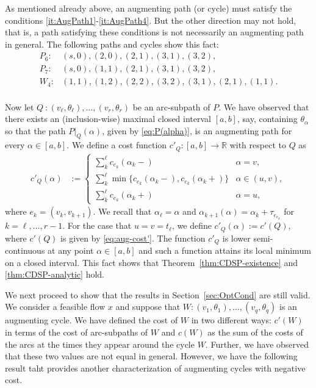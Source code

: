 \documentclass{svjour3}                     \smartqed
\newcommand{\rr}{\ensuremath{\mathbb{R}}}
\begin{document}
\begin{example}
As mentioned already above, an augmenting path (or cycle) must satisfy the conditions \eqref{it:AugPath1}-\eqref{it:AugPath4}. But the other direction may not hold, that is,
a path satisfying these conditions is not necessarily an augmenting path in general. The following paths and cycles show this fact:
\begin{align*}
P_6:&(s,0),(2,0),(2,1),(3,1),(3,2),\\
P_7:&(s,0),(1,1),(2,1),(3,1),(3,2),\\
W_4:&(1,1),(1,2),(2,2),(3,2),(3,1),(2,1),(1,1).\\
\end{align*}

\end{example}


Now let $Q~:(v_\ell,\theta_\ell),\ldots,(v_r,\theta_r)$ be an arc-subpath of $P$. We have observed that there exists an (inclusion-wise) maximal closed interval $[a,b]$, say, containing $\theta_\alpha$ so that the path $P|_Q(\alpha)$, given by \eqref{eq:P(alpha)}, is an augmenting path for every $\alpha\in [a,b]$. We define a cost function $c'_Q:[a,b]\rightarrow \rr$ with respect to $Q$ as
\begin{align*}
c'_Q(\alpha)&:=\begin{cases}
        	\sum_{k}^{\ell}{c_{e_{k}}(\alpha_{k}-)}& \alpha=v,\\
		\sum_{k}^{\ell}\min\{c_{e_{k}}(\alpha_{k}-),c_{e_{k}}(\alpha_{k}+)\}& \alpha\in (u,v),\\
		\sum_{k}^{\ell}{c_{e_{k}}(\alpha_{k}+)}& \alpha=u,
             \end{cases}
\end{align*}
where $e_k=(v_k,v_{k+1})$. We recall that $\alpha_\ell=\alpha$ and $\alpha_{k+1}(\alpha)=\alpha_{k}+\tau_{e_{e_k}}$ for $k=\ell,\ldots,r-1$. For the case that $u=v=t_\ell$, we define $c'_Q(\alpha):=c'(Q)$, where $c'(Q)$ is given by \eqref{eq:aug-cost'}. The function $c'_Q$ is lower semi-continuous at any point $\alpha\in [a,b]$ and such a function attains its local minimum on a closed interval. This fact shows that Theorem~\ref{thm:CDSP-existence} and \ref{thm:CDSP-analytic} hold.


We next proceed to show that the results in Section~\ref{sec:OptCond} are still valid. We consider a feasible flow $x$ and suppose that $W: (v_1,\theta_1), \ldots, (v_q,\theta_q)$ is an augmenting cycle. We have defined the cost of $W$ in two different ways: $c'(W)$ in terms of the cost of arc-subpaths of $W$ and $c(W)$ as the sum of the costs of the arcs at the times they appear around the cycle $W$. Further, we have observed that these two values are not equal in general. However, we have the following result taht provides another characterization of augmenting cycles with negative cost.
\end{document}
